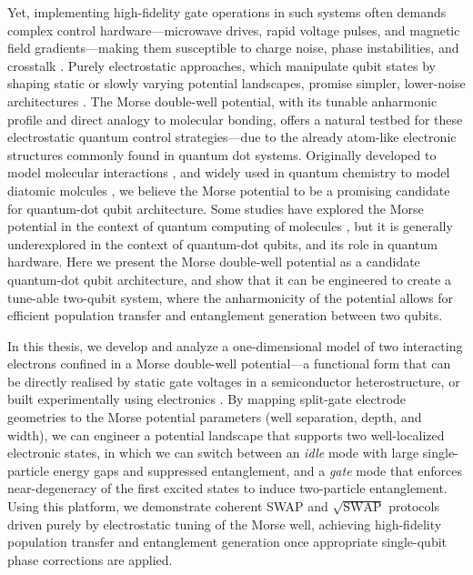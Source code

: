 \documentclass{subfiles}
\begin{document}
Yet, implementing high-fidelity gate operations in such systems often demands complex control hardware—microwave drives, rapid voltage pulses, and magnetic field gradients—making them susceptible to charge noise, phase instabilities, and crosstalk \cite{xue2022quantum, kuhlmann2013charge, heinz2021crosstalk}. Purely electrostatic approaches, which manipulate qubit states by shaping static or slowly varying potential landscapes, promise simpler, lower-noise architectures \cite{veldhorst2014addressable, leinonen2024coulomb}. The Morse double-well potential, with its tunable anharmonic profile and direct analogy to molecular bonding, offers a natural testbed for these electrostatic quantum control strategies—due to the already atom-like electronic structures commonly found in quantum dot systems. Originally developed to model molecular interactions \cite{morse1929diatomic}, and widely used in quantum chemistry to model diatomic molcules \cite{piela2006ideas}, we believe the Morse potential to be a promising candidate for quantum-dot qubit architecture. Some studies have explored the Morse potential in the context of quantum computing of molecules \cite{apanavicius2021morse}, but it is generally underexplored in the context of quantum-dot qubits, and its role in quantum hardware. Here we present the Morse double-well potential as a candidate quantum-dot qubit architecture, and show that it can be engineered to create a tune-able two-qubit system, where the anharmonicity of the potential allows for efficient population transfer and entanglement generation between two qubits. 

In this thesis, we develop and analyze a one-dimensional model of two interacting electrons confined in a Morse double-well potential—a functional form that can be directly realised by static gate voltages in a semiconductor heterostructure, or built experimentally using electronics \cite{smet2002gate, leinonen2024coulomb}. By mapping split-gate electrode geometries to the Morse potential parameters (well separation, depth, and width), we can engineer a potential landscape that supports two well-localized electronic states, in which we can switch between an \textit{idle} mode with large single-particle energy gaps and suppressed entanglement, and a \textit{gate} mode that enforces near-degeneracy of the first excited states to induce two-particle entanglement. Using this platform, we demonstrate coherent SWAP and $\sqrt{\text{SWAP}}$ protocols driven purely by electrostatic tuning of the Morse well, achieving high-fidelity population transfer and entanglement generation once appropriate single-qubit phase corrections are applied.
\end{document}
